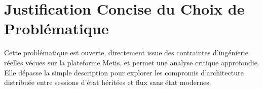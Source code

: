 \documentclass[11pt,a4paper]{article}
\begin{document}
\section{Justification Concise du Choix de Problématique}
Cette problématique est ouverte, directement issue des contraintes d'ingénierie réelles vécues sur la plateforme Metis, et permet une analyse critique approfondie. Elle dépasse la simple description pour explorer les compromis d'architecture distribuée entre sessions d'état héritées et flux sans état modernes.
\end{document}
